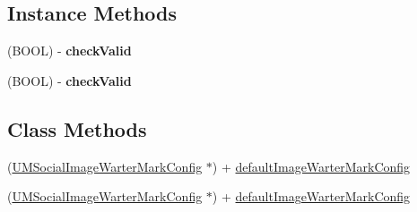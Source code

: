 \subsection*{Instance Methods}
\begin{DoxyCompactItemize}
\item 
\mbox{\label{interface_u_m_social_image_warter_mark_config_a3a0ccfab869be3091fdaf0fefaa4caf0}} 
(B\+O\+OL) -\/ {\bfseries check\+Valid}
\item 
\mbox{\label{interface_u_m_social_image_warter_mark_config_a3a0ccfab869be3091fdaf0fefaa4caf0}} 
(B\+O\+OL) -\/ {\bfseries check\+Valid}
\end{DoxyCompactItemize}
\subsection*{Class Methods}
\begin{DoxyCompactItemize}
\item 
(\mbox{\hyperlink{interface_u_m_social_image_warter_mark_config}{U\+M\+Social\+Image\+Warter\+Mark\+Config}} $\ast$) + \mbox{\hyperlink{interface_u_m_social_image_warter_mark_config_a3913ff8c1c7b237c41bf641444eb4d8e}{default\+Image\+Warter\+Mark\+Config}}
\item 
(\mbox{\hyperlink{interface_u_m_social_image_warter_mark_config}{U\+M\+Social\+Image\+Warter\+Mark\+Config}} $\ast$) + \mbox{\hyperlink{interface_u_m_social_image_warter_mark_config_a3913ff8c1c7b237c41bf641444eb4d8e}{default\+Image\+Warter\+Mark\+Config}}
\end{DoxyCompactItemize}
